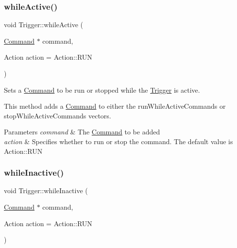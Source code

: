 \subsubsection{\texorpdfstring{whileActive()}{whileActive()}}
{\footnotesize\ttfamily void Trigger\+::while\+Active (\begin{DoxyParamCaption}\item[{\mbox{\hyperlink{classlib_iterative_robot_1_1_command}{Command}} $\ast$}]{command,  }\item[{Action}]{action = {\ttfamily Action\+:\+:RUN} }\end{DoxyParamCaption})\hspace{0.3cm}{\ttfamily [protected]}}



Sets a \mbox{\hyperlink{classlib_iterative_robot_1_1_command}{Command}} to be run or stopped while the \mbox{\hyperlink{classlib_iterative_robot_1_1_trigger}{Trigger}} is active. 

This method adds a \mbox{\hyperlink{classlib_iterative_robot_1_1_command}{Command}} to either the run\+While\+Active\+Commands or stop\+While\+Active\+Commands vectors.


\begin{DoxyParams}{Parameters}
{\em command} & The \mbox{\hyperlink{classlib_iterative_robot_1_1_command}{Command}} to be added \\
\hline
{\em action} & Specifies whether to run or stop the command. The default value is Action\+::\+R\+UN \\
\hline
\end{DoxyParams}
\mbox{\label{classlib_iterative_robot_1_1_trigger_a7de90fbdaa1d6450f6f1bc532af85686}} 
\subsubsection{\texorpdfstring{whileInactive()}{whileInactive()}}
{\footnotesize\ttfamily void Trigger\+::while\+Inactive (\begin{DoxyParamCaption}\item[{\mbox{\hyperlink{classlib_iterative_robot_1_1_command}{Command}} $\ast$}]{command,  }\item[{Action}]{action = {\ttfamily Action\+:\+:RUN} }\end{DoxyParamCaption})\hspace{0.3cm}{\ttfamily [protected]}}



